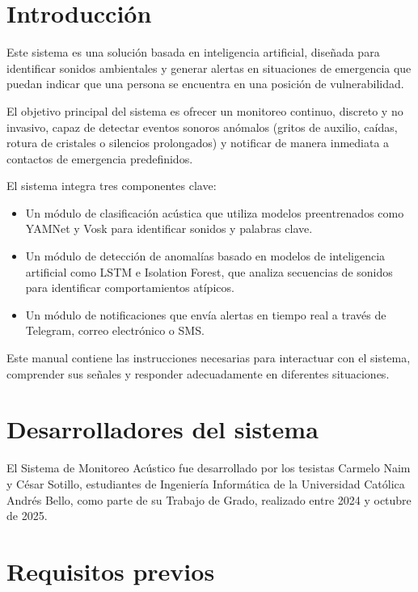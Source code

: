 
\section*{Introducción}

Este sistema es una solución basada en inteligencia artificial, diseñada para identificar sonidos ambientales y generar alertas en situaciones de emergencia que puedan indicar que una persona se encuentra en una posición de vulnerabilidad.

El objetivo principal del sistema es ofrecer un monitoreo continuo, discreto y no invasivo, capaz de detectar eventos sonoros anómalos (gritos de auxilio, caídas, rotura de cristales o silencios prolongados) y notificar de manera inmediata a contactos de emergencia predefinidos.

El sistema integra tres componentes clave:

\begin{itemize}
  \item Un módulo de clasificación acústica que utiliza modelos preentrenados como YAMNet y Vosk para identificar sonidos y palabras clave.
  \item Un módulo de detección de anomalías basado en modelos de inteligencia artificial como LSTM e Isolation Forest, que analiza secuencias de sonidos para identificar comportamientos atípicos.
  \item Un módulo de notificaciones que envía alertas en tiempo real a través de Telegram, correo electrónico o SMS.
\end{itemize}

Este manual contiene las instrucciones necesarias para interactuar con el sistema, comprender sus señales y responder adecuadamente en diferentes situaciones.

\section*{Desarrolladores del sistema}

El Sistema de Monitoreo Acústico fue desarrollado por los tesistas Carmelo Naim y César Sotillo, estudiantes de Ingeniería Informática de la Universidad Católica Andrés Bello, como parte de su Trabajo de Grado, realizado entre 2024 y octubre de 2025.

\section*{Requisitos previos}

